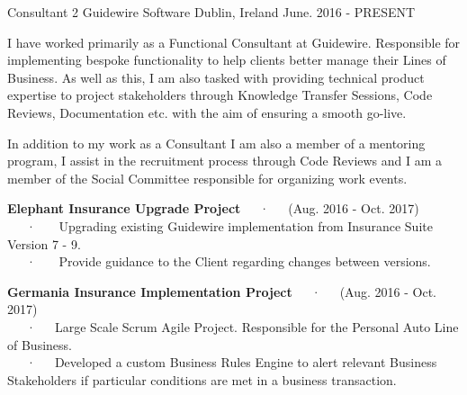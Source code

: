 

\begin{cventries}
      \cventry
    {Consultant 2} %
    {Guidewire Software} %
    {Dublin, Ireland} %
    {June. 2016 - PRESENT} %
    {
    \begin{cvitems} %
    	\item {I have worked primarily as a Functional Consultant at Guidewire. Responsible for implementing  bespoke functionality to help clients better manage their Lines of Business. As well as this, I am also tasked with providing technical product expertise to project stakeholders through Knowledge Transfer Sessions, Code Reviews, Documentation etc. with the aim of ensuring a smooth go-live. }
    	\item {In addition to my work as a Consultant I am also a member of a mentoring program, I assist in the recruitment process through Code Reviews and I am a member of the Social Committee responsible for organizing work events.{\\}}
        \item {\textbf{\footnotesize{Elephant Insurance Upgrade Project}}~~~·~~~{\tiny (Aug. 2016 - Oct. 2017)} {\\}
	~~~·~~~ Upgrading existing Guidewire implementation from Insurance Suite Version 7 - 9. {\\}
	~~~·~~~ Provide guidance to the Client regarding changes between versions.
	{\\}
        }
    \item {\textbf{\footnotesize{Germania Insurance Implementation Project}}~~~·~~~{\tiny (Aug. 2016 - Oct. 2017)}{\\}
	~~~·~~~Large Scale Scrum Agile Project. Responsible for the Personal Auto Line of Business.
{\\}
	~~~·~~~Developed a custom Business Rules Engine to alert relevant Business Stakeholders if particular conditions are met in a business transaction.
{\\}
}
\end{cvitems}}
\end{cventries}

